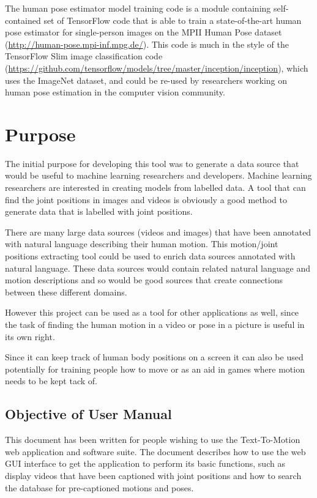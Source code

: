 \documentclass{scrreprt}
\begin{document}
The human pose estimator model training code is a module containing
self-contained set of TensorFlow code that is able to train a state-of-the-art
human pose estimator for single-person images on the MPII Human Pose dataset
(\url{http://human-pose.mpi-inf.mpg.de/}). This code is much in the style of
the TensorFlow Slim image classification code
(\url{https://github.com/tensorflow/models/tree/master/inception/inception}),
which uses the ImageNet dataset, and could be re-used by researchers working on
human pose estimation in the computer vision community.

\section{Purpose}

The initial purpose for developing this tool was to generate a data source that
would be useful to machine learning researchers and developers.  Machine
learning researchers are interested in creating models from labelled data.  A
tool that can find the joint positions in images and videos is obviously a good
method to generate data that is labelled with joint positions.

There are many large data sources (videos and images) that have been annotated
with natural language describing their human motion. This motion/joint positions
extracting tool could be used to enrich data sources annotated with natural
language.  These data sources would contain related natural language  and
motion descriptions and so would be good sources that create connections
between these different domains.

However this project can be used as a tool for other applications as well, since
the task of finding the human motion in a video or pose in a picture is useful
in its own right.

Since it can keep track of human body positions on a screen it can also be used
potentially for training people how to move or as an aid in games where motion
needs to be kept tack of.

\subsection{Objective of User Manual}

This document has been written for people wishing to use the Text-To-Motion web
application and software suite.  The document describes how to use the web GUI
interface to get the application to perform its basic functions, such as
display videos that have been captioned with joint positions and how to search
the database for pre-captioned motions and poses.
\end{document}
